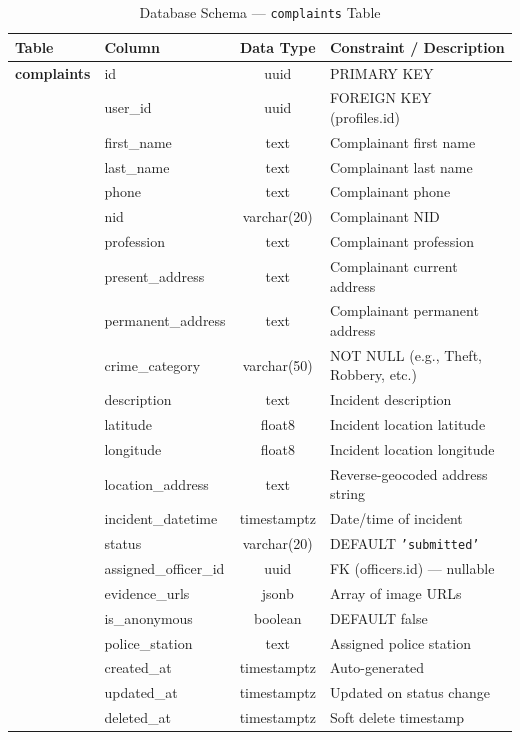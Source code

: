 \documentclass[12pt, a4paper, twoside]{report}
\begin{document}
\begin{table}[ht]
\centering
\caption{Database Schema --- \texttt{complaints} Table}
\label{tab:complaints}
\begin{tabularx}{\textwidth}{p{3cm} p{3cm} c X}
\toprule
\textbf{Table} & \textbf{Column} & \textbf{Data Type} & \textbf{Constraint / Description} \\
\midrule
\textbf{complaints} & id & uuid & PRIMARY KEY \\
& user\_id & uuid & FOREIGN KEY (profiles.id) \\
& first\_name & text & Complainant first name \\
& last\_name & text & Complainant last name \\
& phone & text & Complainant phone \\
& nid & varchar(20) & Complainant NID \\
& profession & text & Complainant profession \\
& present\_address & text & Complainant current address \\
& permanent\_address & text & Complainant permanent address \\
& crime\_category & varchar(50) & NOT NULL (e.g., Theft, Robbery, etc.) \\
& description & text & Incident description \\
& latitude & float8 & Incident location latitude \\
& longitude & float8 & Incident location longitude \\
& location\_address & text & Reverse-geocoded address string \\
& incident\_datetime & timestamptz & Date/time of incident \\
& status & varchar(20) & DEFAULT \texttt{'submitted'} \\
& assigned\_officer\_id & uuid & FK (officers.id) --- nullable \\
& evidence\_urls & jsonb & Array of image URLs \\
& is\_anonymous & boolean & DEFAULT false \\
& police\_station & text & Assigned police station \\
& created\_at & timestamptz & Auto-generated \\
& updated\_at & timestamptz & Updated on status change \\
& deleted\_at & timestamptz & Soft delete timestamp \\
\bottomrule
\end{tabularx}
\end{table}
\end{document}
